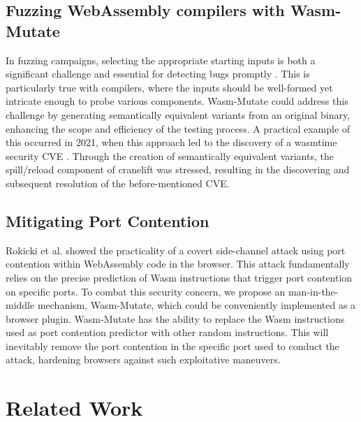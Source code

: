 \documentclass[sigplan,screen]{acmart}
\newcommand{\tool}{{\sc Wasm-Mutate}\xspace}
\newcommand{\wasm}{Wasm\xspace}
\newcommand{\Wasm}{WebAssembly\xspace}
\begin{document}
\subsection{Fuzzing \Wasm compilers with \tool}

In fuzzing campaigns, selecting the appropriate starting inputs is both a significant challenge and essential for detecting bugs promptly \cite{7958599}. 
This is particularly true with compilers, where the inputs should be well-formed yet intricate enough to probe various components. 
\tool could address this challenge by generating semantically equivalent variants from an original binary, enhancing the scope and efficiency of the testing process. 
A practical example of this occurred in 2021, when this approach led to the discovery of a wasmtime security CVE \cite{CVE}. 
Through the creation of semantically equivalent variants, the spill/reload component of cranelift was stressed, resulting in the discovering and subsequent resolution of the before-mentioned CVE.



\subsection{Mitigating Port Contention} 
Rokicki et al. \cite{10.1145/3488932.3517411} showed the practicality of a covert side-channel attack using port contention within \Wasm code in the browser. This attack fundamentally relies on the precise prediction of Wasm instructions that trigger port contention on specific ports.
To combat this security concern, we propose an man-in-the-middle mechanism, \tool, which could be conveniently implemented as a browser plugin. 
\tool has the ability to replace the \wasm instructions used as port contention predictor with other random instructions.
This will inevitably remove the port contention in the specific port used to conduct the attack, hardening browsers against such exploitative maneuvers.




\section{Related Work}
\label{rw}
\end{document}

